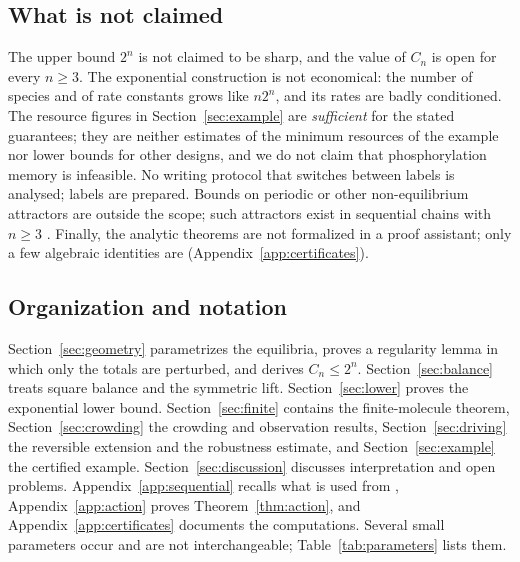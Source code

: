 \documentclass[11pt]{article}
\theoremstyle{plain}
\theoremstyle{definition}
\theoremstyle{remark}
\numberwithin{equation}{section}
\begin{document}
\subsection{What is not claimed}
The upper bound \(2^n\) is not claimed to be sharp, and the value of \(C_n\) is open for every
\(n\ge3\). The exponential construction is not economical: the number of species and of rate
constants grows like \(n2^n\), and its rates are badly conditioned. The resource figures in
Section~\ref{sec:example} are \emph{sufficient} for the stated guarantees; they are neither
estimates of the minimum resources of the example nor lower bounds for other designs, and we do
not claim that phosphorylation memory is infeasible. No writing protocol that switches
between labels is analysed; labels are prepared. Bounds on periodic or other non-equilibrium
attractors are outside the scope; such attractors exist in sequential chains with \(n\ge3\)
\cite{CompanionOsc}. Finally, the analytic theorems are not formalized in a proof assistant;
only a few algebraic identities are (Appendix~\ref{app:certificates}).

\subsection{Organization and notation}
Section~\ref{sec:geometry} parametrizes the equilibria, proves a regularity lemma in which
only the totals are perturbed, and derives \(C_n\le2^n\). Section~\ref{sec:balance} treats
square balance and the symmetric lift. Section~\ref{sec:lower} proves the exponential lower
bound. Section~\ref{sec:finite} contains the finite-molecule theorem, Section~\ref{sec:crowding}
the crowding and observation results, Section~\ref{sec:driving} the reversible extension and
the robustness estimate, and Section~\ref{sec:example} the certified example.
Section~\ref{sec:discussion} discusses interpretation and open problems.
Appendix~\ref{app:sequential} recalls what is used from \cite{Companion},
Appendix~\ref{app:action} proves Theorem~\ref{thm:action}, and
Appendix~\ref{app:certificates} documents the computations. Several small parameters occur and
are not interchangeable; Table~\ref{tab:parameters} lists them.
\end{document}
